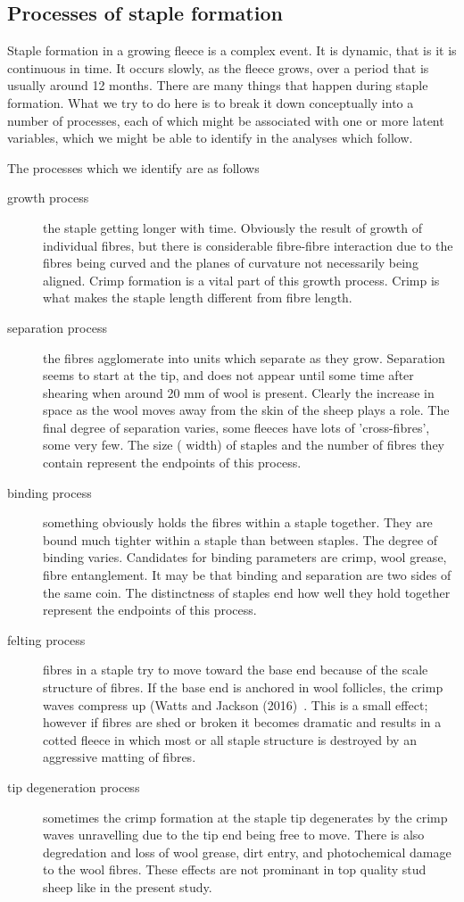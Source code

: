 \documentclass[titlepage]{article}  %
\begin{document}
\subsection{Processes of staple formation}
Staple formation in a growing fleece is a complex event. It is dynamic, that is it is continuous in time. It occurs slowly, as the fleece grows, over a period that is usually around 12 months. There are many things that happen during staple formation. What we try to do here is to break it down conceptually into a number of processes, each of which might be associated with one or more latent variables, which we might be able to identify in the analyses which follow. 

The processes which we identify are as follows
\begin{description}
\item[growth process] the staple getting longer with time. Obviously the result of growth of individual fibres, but there is considerable fibre-fibre interaction due to the fibres being curved and the planes of curvature not necessarily being aligned. Crimp formation is a vital part of this growth process. Crimp is what makes the staple length different from fibre length.
\item[separation process] the fibres agglomerate into units which separate as they grow. Separation seems to start at the tip, and does not appear until some time after shearing when around 20 mm of wool is present. Clearly the increase in space as the wool moves away from the skin of the sheep plays a role. The final degree of separation varies, some fleeces have lots of 'cross-fibres', some very few. The size ( width) of staples and the number of fibres they contain represent the endpoints of this process.
\item[binding process]  something obviously holds the fibres within a staple together. They are bound much tighter within a staple than between staples.  The degree of binding varies. Candidates for binding parameters are crimp, wool grease, fibre entanglement. It may be that binding and separation are two sides of the same coin.  The distinctness of staples end how well they hold together represent the endpoints of this process.
\item[felting process] fibres in a staple try to move toward the base end because of the scale structure of fibres. If the base end is anchored in wool follicles, the crimp waves compress up (Watts and Jackson (2016)~\cite{watt:16}. This is a small effect; however if fibres are shed or broken it becomes dramatic and results in a cotted fleece in which most or all staple structure is destroyed by an aggressive matting of fibres.
\item[tip degeneration process] sometimes the crimp formation at the staple tip degenerates by the crimp waves unravelling due to the tip end being free to move. There is also degredation and loss of wool grease, dirt entry, and photochemical damage to the wool fibres. These effects are not prominant in top quality stud sheep like in the present study.
\end{description}
\end{document}
